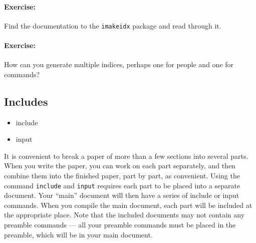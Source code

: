         \paragraph{Exercise:} Find the documentation to the \texttt{imakeidx} package and read through it.

        \paragraph{Exercise:} How can you generate multiple indices, perhaps one for people and one for commands?

        \subsection{Includes}
        \label{Includes}
        
        \begin{cmd}
            \begin{itemize}
                \item{include}
                \item{input}
            \end{itemize}
        \end{cmd}

It is convenient to break a paper of more than a few sections into several parts. When you write the paper, you can work on each part separately, and then combine them into the finished paper, part by part, as convenient. Using the command \texttt{include} and \texttt{input} requires each part to be placed into a separate document. Your ``main'' document will then have a series of include or input commands. When you compile the main document, each part will be included at the appropriate place. Note that the included documents may not contain any preamble commands --- all your preamble commands must be placed in the preamble, which will be in your main document.

